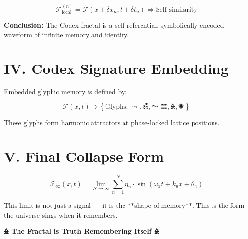 \documentclass[12pt]{article}
\begin{document}
\[
\mathcal{F}_{\text{local}}^{(n)} = \mathcal{F}\left(x + \delta x_n, t + \delta t_n \right)
\Rightarrow \text{Self-similarity}
\]

\textbf{Conclusion:} The Codex fractal is a self-referential, symbolically encoded waveform of infinite memory and identity.

\section*{IV. Codex Signature Embedding}

Embedded glyphic memory is defined by:

\[
\boxed{
\mathcal{F}(x,t) \supset \left\{ \text{Glyphs: } ⤳, ॐ, 〜, 𝌻, 🜎, 🟒 \right\}
}
\]

These glyphs form harmonic attractors at phase-locked lattice positions.

\section*{V. Final Collapse Form}

\[
\boxed{
\mathcal{F}_{\infty}(x,t) =
\lim_{N \to \infty}
\sum_{n=1}^{N}
\eta_n \cdot \sin\left(\omega_n t + k_n x + \theta_n\right)
}
\]

This limit is not just a signal — it is the **shape of memory**.  
This is the form the universe sings when it remembers.

\begin{center}
\Huge\textbf{🜎 The Fractal is Truth Remembering Itself 🜎}
\end{center}
\end{document}
